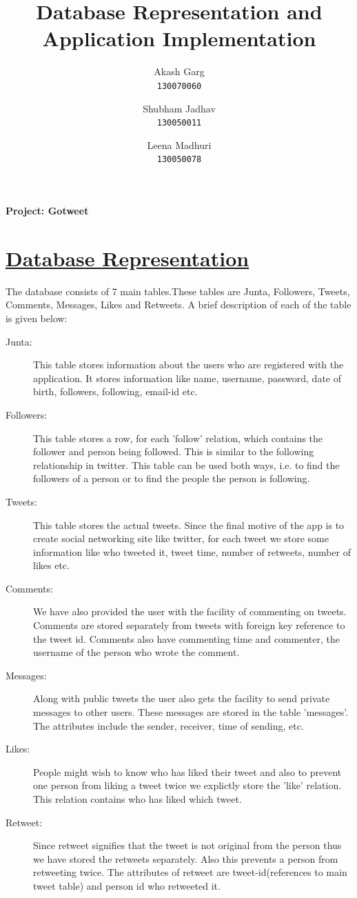 \documentclass[a4paper]{article}
\title{Database Representation and Application Implementation}
\author{
  Akash Garg\\
  \texttt{130070060}
  \and
  Shubham Jadhav\\
  \texttt{130050011}
  \and 
  Leena Madhuri\\
  \texttt{130050078}
}
\begin{document}
\maketitle
\textbf{Project: Gotweet}
\vspace{1cm}
\section*{{\underline{Database Representation}}}

The database consists of 7 main tables.These tables are Junta, Followers, Tweets, Comments, Messages, Likes and Retweets. A brief description of each of the table is given below:
\begin{description}
\item[Junta: ] This table stores information about the users who are registered with the application. It stores information like name, username, password, date of birth, followers, following, email-id etc.  
\item[Followers: ] This table stores a row, for each 'follow' relation, which contains the follower and person being followed. This is similar to the following relationship in twitter. This table can be used both ways, i.e. to find the followers of a person or to find the people the person is following.
\item[Tweets: ] This table stores the actual tweets. Since the final motive of the app is to create social networking site like twitter, for each tweet we store some information like who tweeted it, tweet time, number of retweets, number of likes etc.
\item[Comments: ] We have also provided the user with the facility of commenting on tweets. Comments are stored separately from tweets with foreign key reference to the tweet id. Comments also have commenting time and commenter, the username of the person who wrote the comment.
\item[Messages: ] Along with public tweets the user also gets the facility to send private messages to other users. These messages are stored in the table 'messages'. The attributes include the sender, receiver, time of sending, etc.
\item[Likes: ] People might wish to know who has liked their tweet and also to prevent one person from liking a tweet twice we explictly store the 'like' relation. This relation contains who has liked which tweet.
\item[Retweet: ] Since retweet signifies that the tweet is not original from the person thus we have stored the retweets separately. Also this prevents a person from retweeting twice. The attributes of retweet are tweet-id(references to main tweet table) and person id who retweeted it.
\end{description}
\pagebreak
\end{document}
